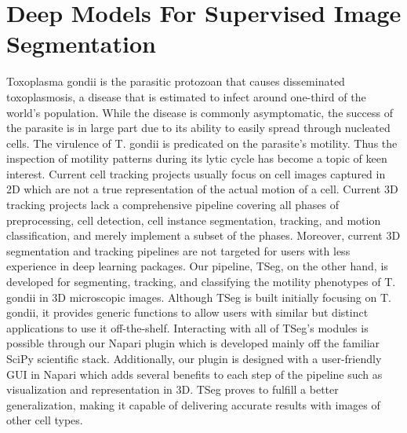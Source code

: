 \documentclass[./dissertation.tex]{subfiles}
\begin{document}
\chapter{Deep Models For Supervised Image Segmentation}
\label{ch:toxo}

Toxoplasma gondii is the parasitic protozoan that causes disseminated toxoplasmosis, a disease that is estimated to infect around one-third of the world's population. While the disease is commonly asymptomatic, the success of the parasite is in large part due to its ability to easily spread through nucleated cells. The virulence of T. gondii is predicated on the parasite's motility. Thus the inspection of motility patterns during its lytic cycle has become a topic of keen interest. Current cell tracking projects usually focus on cell images captured in 2D which are not a true representation of the actual motion of a cell. Current 3D tracking projects lack a comprehensive pipeline covering all phases of preprocessing, cell detection, cell instance segmentation, tracking, and motion classification, and merely implement a subset of the phases. Moreover, current 3D segmentation and tracking pipelines are not targeted for users with less experience in deep learning packages. Our pipeline, TSeg, on the other hand, is developed for segmenting, tracking, and classifying the motility phenotypes of T. gondii in 3D microscopic images. Although TSeg is built initially focusing on T. gondii, it provides generic functions to allow users with similar but distinct applications to use it off-the-shelf. Interacting with all of TSeg's modules is possible through our Napari plugin which is developed mainly off the familiar SciPy scientific stack. Additionally, our plugin is designed with a user-friendly GUI in Napari which adds several benefits to each step of the pipeline such as visualization and representation in 3D. TSeg proves to fulfill a better generalization, making it capable of delivering accurate results with images of other cell types.
\end{document}
